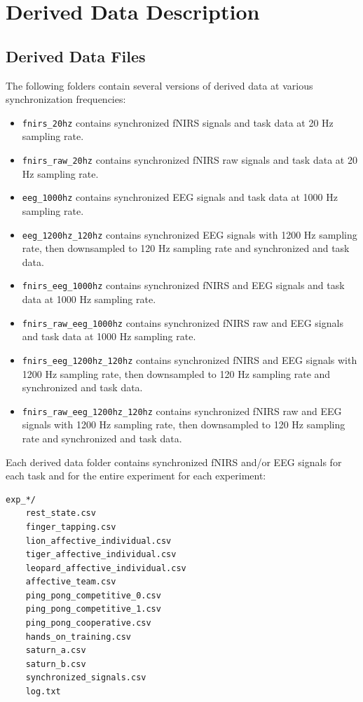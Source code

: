 \section{Derived Data Description}

\subsection{Derived Data Files}

The following folders contain several versions of derived data at various synchronization frequencies:
\begin{itemize}
  \item \texttt{fnirs\_20hz} contains synchronized fNIRS signals and task data at 20 Hz sampling rate.
  \item \texttt{fnirs\_raw\_20hz} contains synchronized fNIRS raw signals and task data at 20 Hz sampling rate.
  \item \texttt{eeg\_1000hz} contains synchronized EEG signals and task data at 1000 Hz sampling rate.
  \item \texttt{eeg\_1200hz\_120hz} contains synchronized EEG signals with 1200 Hz sampling rate, then downsampled to 120 Hz sampling rate and synchronized and task data.
  \item \texttt{fnirs\_eeg\_1000hz} contains synchronized fNIRS and EEG signals and task data at 1000 Hz sampling rate.
  \item \texttt{fnirs\_raw\_eeg\_1000hz} contains synchronized fNIRS raw and EEG signals and task data at 1000 Hz sampling rate.
  \item \texttt{fnirs\_eeg\_1200hz\_120hz} contains synchronized fNIRS and EEG signals with 1200 Hz sampling rate, then downsampled to 120 Hz sampling rate and synchronized and task data.
  \item \texttt{fnirs\_raw\_eeg\_1200hz\_120hz} contains synchronized fNIRS raw and EEG signals with 1200 Hz sampling rate, then downsampled to 120 Hz sampling rate and synchronized and task data.
\end{itemize}

Each derived data folder contains synchronized fNIRS and/or EEG signals for each task and for the entire experiment for each experiment:
\begin{verbatim}
exp_*/
    rest_state.csv
    finger_tapping.csv
    lion_affective_individual.csv
    tiger_affective_individual.csv
    leopard_affective_individual.csv
    affective_team.csv
    ping_pong_competitive_0.csv
    ping_pong_competitive_1.csv
    ping_pong_cooperative.csv
    hands_on_training.csv
    saturn_a.csv
    saturn_b.csv
    synchronized_signals.csv
    log.txt
\end{verbatim}

